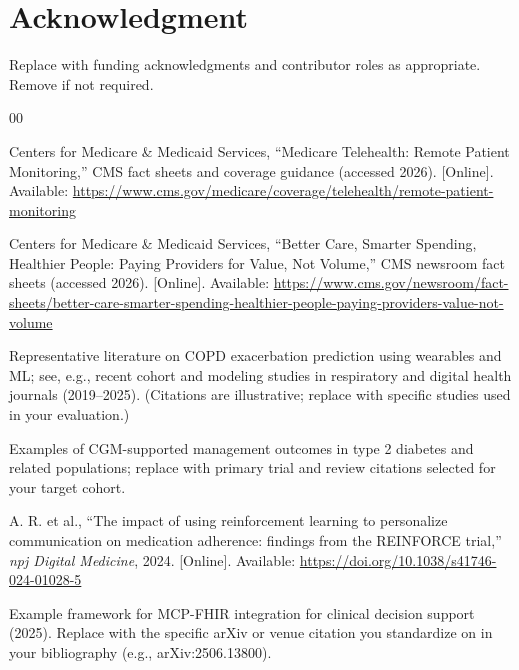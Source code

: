 \documentclass[conference]{IEEEtran}
\begin{document}
\section*{Acknowledgment}
Replace with funding acknowledgments and contributor roles as appropriate. Remove if not required.

\begin{thebibliography}{00}

Centers for Medicare \& Medicaid Services, ``Medicare Telehealth: Remote Patient Monitoring,'' CMS fact sheets and coverage guidance (accessed 2026). [Online]. Available: \url{https://www.cms.gov/medicare/coverage/telehealth/remote-patient-monitoring}

Centers for Medicare \& Medicaid Services, ``Better Care, Smarter Spending, Healthier People: Paying Providers for Value, Not Volume,'' CMS newsroom fact sheets (accessed 2026). [Online]. Available: \url{https://www.cms.gov/newsroom/fact-sheets/better-care-smarter-spending-healthier-people-paying-providers-value-not-volume}

Representative literature on COPD exacerbation prediction using wearables and ML; see, e.g., recent cohort and modeling studies in respiratory and digital health journals (2019--2025). (Citations are illustrative; replace with specific studies used in your evaluation.)

Examples of CGM-supported management outcomes in type 2 diabetes and related populations; replace with primary trial and review citations selected for your target cohort.

A. R. et al., ``The impact of using reinforcement learning to personalize communication on medication adherence: findings from the REINFORCE trial,'' \emph{npj Digital Medicine}, 2024. [Online]. Available: \url{https://doi.org/10.1038/s41746-024-01028-5}

Example framework for MCP-FHIR integration for clinical decision support (2025). Replace with the specific arXiv or venue citation you standardize on in your bibliography (e.g., arXiv:2506.13800).

\end{thebibliography}
\end{document}

